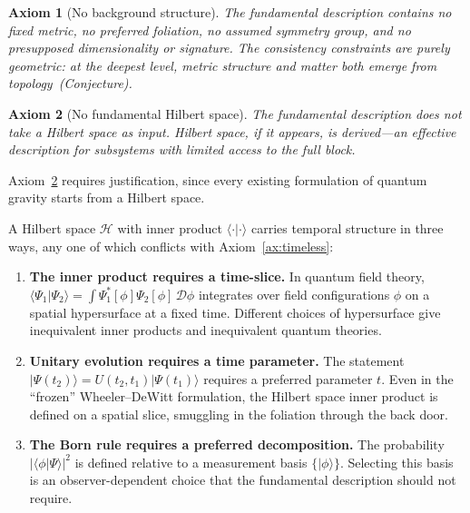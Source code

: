\documentclass[12pt,a4paper]{article}
\newtheorem{axiom}{Axiom}
\theoremstyle{definition}
\theoremstyle{remark}
\begin{document}
\begin{axiom}[No background structure]
\label{ax:nobackground}
The fundamental description contains no fixed metric, no preferred
foliation, no assumed symmetry group, and no presupposed dimensionality
or signature. The consistency constraints are purely geometric: at the
deepest level, metric structure and matter both emerge from
topology~(Conjecture).
\end{axiom}

\begin{axiom}[No fundamental Hilbert space]
\label{ax:nohilbert}
The fundamental description does not take a Hilbert space as input.
Hilbert space, if it appears, is derived---an effective description for
subsystems with limited access to the full block.
\end{axiom}

Axiom~\ref{ax:nohilbert} requires justification, since every existing
formulation of quantum gravity starts from a Hilbert space.

A Hilbert space $\mathcal{H}$ with inner product
$\langle\cdot|\cdot\rangle$ carries temporal structure in three ways,
any one of which conflicts with Axiom~\ref{ax:timeless}:

\begin{enumerate}

\item \textbf{The inner product requires a time-slice.} In quantum field
theory, $\langle\Psi_1|\Psi_2\rangle = \int \Psi_1^*[\phi]\Psi_2[\phi]
\,\mathcal{D}\phi$ integrates over field configurations $\phi$ on a spatial
hypersurface at a fixed time. Different choices of hypersurface give
inequivalent inner products and inequivalent quantum theories.

\item \textbf{Unitary evolution requires a time parameter.} The statement
$|\Psi(t_2)\rangle = U(t_2, t_1)|\Psi(t_1)\rangle$ requires a preferred
parameter $t$. Even in the ``frozen'' Wheeler--DeWitt formulation, the
Hilbert space inner product is defined on a spatial slice, smuggling in
the foliation through the back door.

\item \textbf{The Born rule requires a preferred decomposition.}
The probability $|\langle\phi|\Psi\rangle|^2$ is defined relative to a
measurement basis $\{|\phi\rangle\}$. Selecting this basis is an
observer-dependent choice that the fundamental description should not
require.

\end{enumerate}
\end{document}
